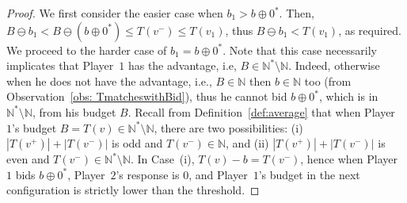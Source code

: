 \documentclass{article}\providecommand{\nequiv}{\not\equiv}\usepackage[a4paper,margin=20mm]{geometry}
\newcommand{\PO}{Player~$1$\xspace}
\newcommand{\PT}{Player~$2$\xspace}
\newcommand{\Nat}{\mathbb{N}}
\newcommand{\Natstro}{\mathbb{N}^* \setminus \mathbb{N}}
\newcommand{\succb}[1]{#1 \oplus 0^*\xspace}
\begin{document}
\begin{proof}
We first consider the easier case when \(b_1 > \succb{b}\). Then, \(B \ominus b_1 < B \ominus (\succb{b}) \leq T(v^-) \leq T(v_1)\), thus $B \ominus b_1 < T(v_1)$, as required. We proceed to the harder case of \(b_1 = \succb{b}\). Note that this case necessarily implicates that \PO has the advantage, i.e, \(B \in \Natstro\). 
Indeed, otherwise when he does not have the advantage, i.e., \(B \in \Nat\) then \(b \in \Nat\) too (from Observation~\ref{obs: TmatcheswithBid}), thus he cannot bid \(\succb{b}\), which is in \(\Natstro\), from his budget \(B\). 
Recall from Definition~\ref{def:average} that when \PO's budget \(B = T(v)  \in \Natstro\), there are two possibilities: (i) \(|T(v^+)| + |T(v^-)|\) is odd and \(T(v^-) \in \Nat\), and (ii) \(|T(v^+)| + |T(v^-)|\) is even and \(T(v^-) \in \Natstro\). In Case~(i), \(T(v) - b = T(v^-)\), hence when \PO bids \(\succb{b}\), \PT's response is \(0\), and \PO's budget in the next configuration is strictly lower than the threshold. 


\end{proof}
\end{document}
